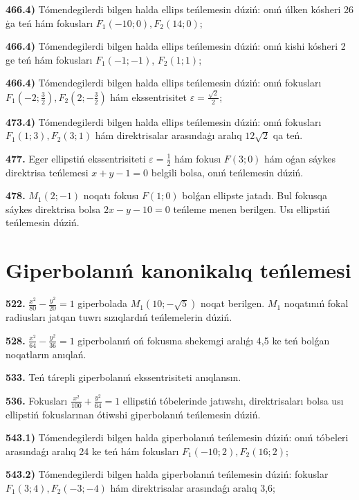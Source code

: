 \textbf{466.4)} Tómendegilerdi bilgen halda ellips teńlemesin dúziń: onıń úlken kósheri 26 ģa teń hám fokusları $F_1 (-10; 0), F_2 (14; 0) $;

\textbf{466.4)} Tómendegilerdi bilgen halda ellips teńlemesin dúziń: onıń kishi kósheri 2 ge teń hám fokusları $F_1 (-1;-1) $, $F_2 (1; 1) $;

\textbf{466.4)} Tómendegilerdi bilgen halda ellips teńlemesin dúziń: onıń fokusları $F_1\left(-2; \frac{3}{2}\right), F_2\left(2;-\frac{3}{2}\right) $ hám ekssentrisitet $\varepsilon=\frac{\sqrt{2}}{2}$;

\textbf{473.4)} Tómendegilerdi bilgen halda ellips teńlemesin dúziń: onıń fokusları $F_1 (1; 3), F_2 (3; 1) $ hám direktrisalar arasındaģı aralıq $12 \sqrt{2}$ qa teń.

\textbf{477.} Eger ellipstiń ekssentrisiteti $\varepsilon=\frac{1}{2}$ hám fokusı $F (3; 0) $ hám oǵan sáykes direktrisa teńlemesi $x+y-1=0$ belgili bolsa, onıń teńlemesin dúziń.

\textbf{478.} $M_1 (2;-1) $ noqatı fokusı $F (1;0) $ bolǵan ellipste jatadı. Bul fokusqa sáykes direktrisa bolsa $2x-y-10=0$ teńleme menen berilgen. Usı ellipstiń teńlemesin dúziń.


\section{Giperbolanıń kanonikalıq teńlemesi}


\textbf{522.} $\frac{x^2}{80}-\frac{y^2}{20}=1$ giperbolada $M_1 (10;-\sqrt{5}) $ noqat berilgen. $M_1$ noqatınıń fokal radiusları jatqan tuwrı sızıqlardıń teńlemelerin dúziń.

\textbf{528.} $\frac{x^2}{64}-\frac{y^2}{36}=1$ giperbolanıń oń fokusına shekemgi aralıǵı 4,5 ke teń bolǵan noqatların anıqlań.

\textbf{533.} Teń tárepli giperbolanıń ekssentrisiteti anıqlansın.

\textbf{536.} Fokusları $\frac{x^2}{100}+\frac{y^2}{64}=1$ ellipstiń tóbelerinde jatıwshı, direktrisaları bolsa usı ellipstiń fokuslarınan ótiwshi giperbolanıń teńlemesin dúziń.

\textbf{543.1)} Tómendegilerdi bilgen halda giperbolanıń teńlemesin dúziń: onıń tóbeleri arasındaǵı aralıq 24 ke teń hám fokusları $F_1 (-10; 2), F_2 (16; 2) $;

\textbf{543.2) } Tómendegilerdi bilgen halda giperbolanıń teńlemesin dúziń: fokuslar $F_1 (3; 4), F_2 (-3;-4) $ hám direktrisalar arasındaǵı aralıq 3,6;

